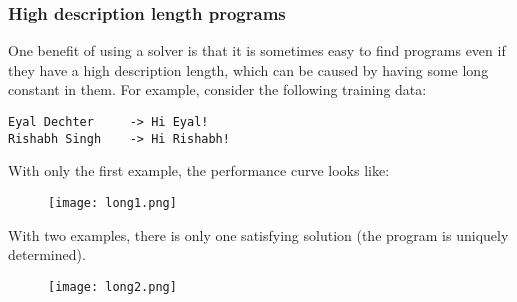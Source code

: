 \documentclass{article}
\begin{document}
\subsubsection{High description length programs}
One benefit of using a solver is that it is sometimes easy to find programs even if they have a high description length,
which can be caused by having some long constant in them.
For example, consider the following training data:
\begin{verbatim}
Eyal Dechter     -> Hi Eyal!
Rishabh Singh    -> Hi Rishabh!
\end{verbatim}

With only the first example, the performance curve looks like:
\begin{figure}
  \texttt{[image: long1.png]}  
\end{figure}

With two examples, there is only one satisfying solution (the program is uniquely determined).
\begin{figure}
  \texttt{[image: long2.png]}  
\end{figure}
\end{document}
